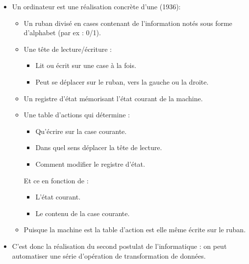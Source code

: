 \documentclass{beamer}
\begin{document}
\begin{slide}
	\begin{itemize}
		\item Un ordinateur est une réalisation concrète d'une  (1936):
			\begin{itemize}
				\item Un ruban divisé en cases contenant de l'information notés sous forme d'alphabet (par ex : 0/1).
				\item Une tête de lecture/écriture :
					\begin{itemize}
						\item Lit ou écrit sur une case à la fois.
						\item Peut se déplacer sur le ruban, vers la gauche ou la droite.
					\end{itemize}
				\item Un registre d'état mémorisant l'état courant de la machine.
				\item Une table d'actions qui détermine :
					\begin{itemize}
						\item Qu'écrire sur la case courante.
						\item Dans quel sens déplacer la tête de lecture.
						\item Comment modifier le registre d'état.
					\end{itemize}
					Et ce en fonction de :
					\begin{itemize}
						\item L'état courant.
						\item Le contenu de la case courante.
					\end{itemize}
				\item Puisque la machine est  la table d'action est elle même écrite sur le ruban.
			\end{itemize}
	
		\item C'est donc la réalisation du second postulat de l'informatique : on peut automatiser une série d'opération de transformation de données.
	\end{itemize}
\end{slide}
\end{document}

